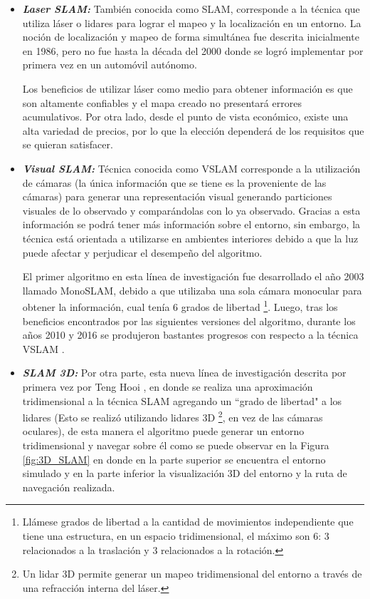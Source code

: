 \begin{itemize}
    \item \textbf{\textit{Laser SLAM: }} También conocida como SLAM, corresponde a la técnica que utiliza láser o lidares para lograr el mapeo y la localización en un entorno. La noción de localización y mapeo de forma simultánea fue descrita inicialmente en 1986, pero no fue hasta la década del 2000 donde se logró implementar por primera vez en un automóvil autónomo.
    
    Los beneficios de utilizar láser como medio para obtener información es que son altamente confiables y el mapa creado no presentará errores acumulativos. Por otra lado, desde el punto de vista económico, existe una alta variedad de precios, por lo que la elección dependerá de los requisitos que se quieran satisfacer.
    
    \item \textbf{\textit{Visual SLAM: }} Técnica conocida como VSLAM corresponde a la utilización de cámaras (la única información que se tiene es la proveniente de las cámaras)  para generar una representación visual generando particiones visuales de lo observado y comparándolas con lo ya observado. Gracias a esta información se podrá tener más información sobre el entorno, sin embargo, la técnica está orientada a utilizarse en ambientes interiores debido a que la luz puede afectar y perjudicar el desempeño del algoritmo.
    
    El primer algoritmo en esta línea de investigación fue desarrollado el año 2003 llamado MonoSLAM, debido a que utilizaba una sola cámara monocular para obtener la información, cual tenía 6 grados de libertad \footnote{ Llámese grados de libertad a la cantidad de movimientos independiente que tiene una estructura, en un espacio tridimensional, el máximo son 6: 3 relacionados a la traslación y 3 relacionados a la rotación.}. Luego, tras los beneficios encontrados por las siguientes versiones del algoritmo, durante los años 2010 y 2016 se produjeron bastantes progresos con respecto a la técnica VSLAM \cite{4160954}.
    
    \item \textbf{\textit{SLAM 3D: }}  Por otra parte, esta nueva línea de investigación descrita por primera vez por Teng Hooi \cite{chan_lidar-based_2021}, en donde se realiza una aproximación tridimensional a la técnica SLAM agregando un ``grado de libertad" a los lidares (Esto se realizó utilizando lidares 3D \footnote{Un lidar 3D permite generar un mapeo tridimensional del entorno a través de una refracción interna del láser. }, en vez de las cámaras oculares), de esta manera el algoritmo puede generar un entorno tridimensional y navegar sobre él como se puede observar en la Figura \ref{fig:3D_SLAM} en donde en la parte superior se encuentra el entorno simulado y en la parte inferior la visualización 3D del entorno y la ruta de navegación realizada.
    

\end{itemize}
